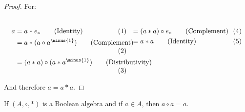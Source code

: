     \begin{proof}
        For:
        \par\vspace{-2.5ex}
        \begin{subequations}
            \begin{minipage}[t]{0.49\textwidth}
                \centering
                \begin{align}
                    a&=a*e_{*}
                    \tag{Identity}\\
                    &=a*(a\circ{a}^{\minus{1}})
                    \tag{Complement}\\
                    &=(a*a)\circ(a*a^{\minus{1}})
                    \tag{Distributivity}
                \end{align}
            \end{minipage}
            \hfill
            \begin{minipage}[t]{0.49\textwidth}
                \centering
                \begin{align}
                    &=(a*a)\circ{e}_{\circ}
                    \tag{Complement}\\
                    &=a*a\tag{Identity}
                \end{align}
            \end{minipage}
        \end{subequations}
        \par\vspace{2.5ex}
        And therefore $a=a*a$.
    \end{proof}
    \begin{theorem}
        \label{thm:Bool_Alg_Idempotent_of_Circ}%
        If $(A,\circ,*)$ is a Boolean algebra and if $a\in{A}$, then
        $a\circ{a}=a$.
    \end{theorem}
